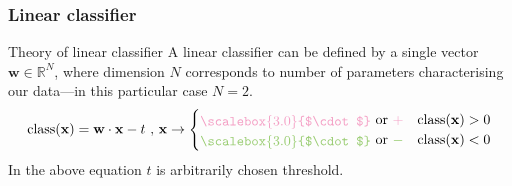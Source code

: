 \documentclass{beamer}
\newcommand*{\LargerCdot}{\raisebox{-0.25ex}{\scalebox{3.0}{$\cdot$}}}
\begin{document}
  \begin{frame}
    \frametitle{Linear classifier}
    \begin{block}{Theory of linear classifier}
      A linear classifier can be defined by a single vector $\mathbf{w} \in \mathbb{R}^N$, where dimension $N$ corresponds to number of parameters characterising our data---in this particular case $N=2$.
      $$
        \text{class}(\mathbf{x}) = \mathbf{w} \cdot \mathbf{x} - t \text{  ,  } \mathbf{x} \rightarrow \begin{cases} \textcolor{redish}{\LargerCdot} \text{ or } \textcolor{redish}{+} & \text{class}(\mathbf{x}) > 0 \\ \textcolor{greenish}{\LargerCdot} \text{ or } \textcolor{greenish}{-} & \text{class}(\mathbf{x}) < 0  \end{cases}
      $$
      In the above equation $t$ is arbitrarily chosen threshold.
    \end{block}
  \end{frame}
\end{document}
